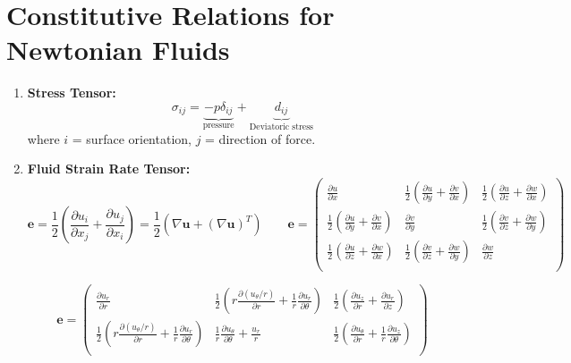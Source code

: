 \documentclass{article}
\begin{document}
\section{Constitutive Relations for Newtonian Fluids}
\begin{enumerate}
    \item \textbf{Stress Tensor:}
      \[\sigma_{ij} = \underbrace{-p\delta_{ij}}_{\text{pressure}} + \underbrace{d_{ij}}_{\text{Deviatoric stress}} \]
      where $i$ = surface orientation, $j$ = direction of force.
 
    \item \textbf{Fluid Strain Rate Tensor:}
      \begin{equation*}
          \mathbf{e} = \frac{1}{2}(\frac{\partial u_{i}}{\partial x_{j}} + \frac{\partial u_{j}}{\partial x_{i}})=\frac{1}{2}(\nabla \mathbf{u}+(\nabla \mathbf{u})^{T})
          \quad \quad
          \mathbf{e} = 
          \begin{pmatrix}
          \frac{\partial u}{\partial x} & \frac{1}{2}(\frac{\partial u}{\partial y}+\frac{\partial v}{\partial x}) & \frac{1}{2}(\frac{\partial u}{\partial z}+\frac{\partial w}{\partial x})\\[0.5em]
          
          \frac{1}{2}(\frac{\partial u}{\partial y}+\frac{\partial v}{\partial x}) & \frac{\partial v}{\partial y}  & \frac{1}{2}(\frac{\partial v}{\partial z}+\frac{\partial w}{\partial y})\\[0.5em]
          
          \frac{1}{2}(\frac{\partial u}{\partial z}+\frac{\partial w}{\partial x}) & \frac{1}{2}(\frac{\partial v}{\partial z}+\frac{\partial w}{\partial y})  & \frac{\partial w}{\partial z}\\
          \end{pmatrix}
      \end{equation*}

      \begin{equation*}
          \mathbf{e} = 
          \begin{pmatrix}
          \frac{\partial u_{r}}{\partial r} & \frac{1}{2}(r\frac{\partial (u_{\theta}/r)}{\partial r}+\frac{1}{r}\frac{\partial u_{r}}{\partial \theta}) & \frac{1}{2}(\frac{\partial u_{z}}{\partial r}+\frac{\partial u_{r}}{\partial z})\\[0.5em]
          
          \frac{1}{2}(r\frac{\partial (u_{\theta}/r)}{\partial r}+\frac{1}{r}\frac{\partial u_{r}}{\partial \theta}) & \frac{1}{r}\frac{\partial u_{\theta}}{\partial \theta}+\frac{u_{r}}{r} & \frac{1}{2}(\frac{\partial u_{\theta}}{\partial r}+\frac{1}{r}\frac{\partial u_{z}}{\partial \theta})\\[0.5em]
          

\end{pmatrix}
\end{equation*}
\end{enumerate}
\end{document}
